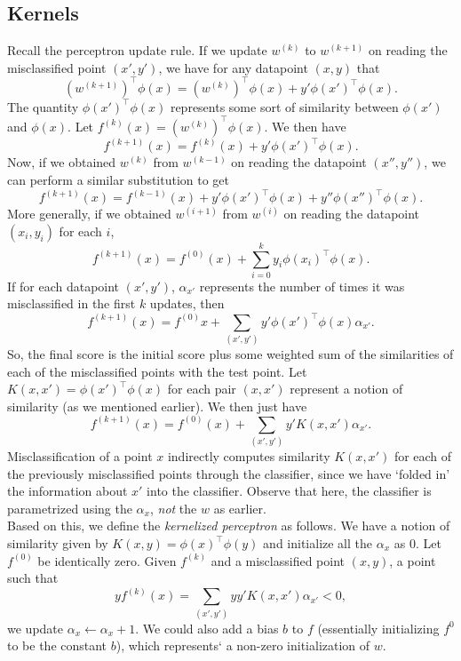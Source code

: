 \documentclass{article}
\begin{document}
	\subsection{Kernels}

		Recall the perceptron update rule. If we update $w^{(k)}$ to $w^{(k+1)}$ on reading the misclassified point $(x',y')$, we have for any datapoint $(x,y)$ that
		\[ (w^{(k+1)})^\top\phi(x) = (w^{(k)})^\top \phi(x) + y' \phi(x')^\top \phi(x). \]
		The quantity $\phi(x')^\top\phi(x)$ represents some sort of similarity between $\phi(x')$ and $\phi(x)$. Let $f^{(k)}(x) = (w^{(k)})^\top\phi(x)$. We then have
		\[ f^{(k+1)}(x) = f^{(k)}(x) + y'\phi(x')^\top\phi(x). \]
		Now, if we obtained $w^{(k)}$ from $w^{(k-1)}$ on reading the datapoint $(x'',y'')$, we can perform a similar substitution to get
		\[ f^{(k+1)}(x) = f^{(k-1)}(x) + y'\phi(x')^\top\phi(x) + y''\phi(x'')^\top\phi(x). \]
		More generally, if we obtained $w^{(i+1)}$ from $w^{(i)}$ on reading the datapoint $(x_i,y_i)$ for each $i$,
		\[ f^{(k+1)}(x) = f^{(0)}(x) + \sum_{i=0}^{k} y_i\phi(x_i)^\top\phi(x). \]
		If for each datapoint $(x',y')$, $\alpha_{x'}$ represents the number of times it was misclassified in the first $k$ updates, then
		\[ f^{(k+1)}(x) = f^{(0)}x + \sum_{(x',y')} y'\phi(x')^\top\phi(x) \alpha_{x'}. \]
		So, the final score is the initial score plus some weighted sum of the similarities of each of the misclassified points with the test point. Let $K(x,x') = \phi(x')^\top\phi(x)$ for each pair $(x,x')$ represent a notion of similarity (as we mentioned earlier). We then just have
		\[ f^{(k+1)}(x) = f^{(0)}(x) + \sum_{(x',y')} y' K(x,x') \alpha_{x'}. \]
		Misclassification of a point $x$ indirectly computes similarity $K(x,x')$ for each of the previously misclassified points through the classifier, since we have `folded in' the information about $x'$ into the classifier. Observe that here, the classifier is parametrized using the $\alpha_{x}$, \emph{not} the $w$ as earlier.\\

		Based on this, we define the \emph{kernelized perceptron} as follows. We have a notion of similarity given by $K(x,y) = \phi(x)^\top\phi(y)$ and initialize all the $\alpha_x$ as $0$. Let $f^{(0)}$ be identically zero. Given $f^{(k)}$ and a misclassified point $(x,y)$, a point such that
		\[ y f^{(k)}(x) = \sum_{(x',y')} yy' K(x,x') \alpha_{x'} < 0, \]
		we update $\alpha_x \gets \alpha_x + 1$. We could also add a bias $b$ to $f$ (essentially initializing $f^{0}$ to be the constant $b$), which represents` a non-zero initialization of $w$.\\
\end{document}
